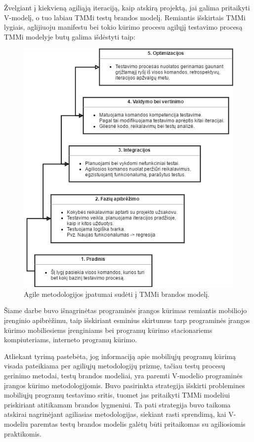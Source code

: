 \documentclass{VUMIFPSkursinis}
\begin{document}
Žvelgiant į kiekvieną agiliąją iteraciją, kaip atskirą projektą, jai galima pritaikyti V-modelį, o tuo labiau TMMi testų brandos modelį. Remiantis išskirtais TMMi lygiais, aglijiuoju manifestu bei tokio kūrimo procesu agilųjį testavimo procesą TMMi modelyje butų galima išdėstyti taip:

\begin{figure}[H]
    \centering
    \includegraphics[scale=0.85]{img/Tmmagile}
    \caption{Agile metodologijos įpatumai sudėti į TMMi brandos modelį.}
    \label{img:tmmiagile}
\end{figure}

Šiame darbe buvo išnagrinėtas programinės įrangos kūrimas remiantis mobiliojo įrenginio apibrėžimu, taip išskiriant esminius skirtumus tarp programinės įrangos kūrimo mobiliesiems įrenginiams bei programų kūrimo stacionariems kompiuteriams, interneto programų kūrimo.

Atliekant tyrimą pastebėta, jog informaciją apie mobiliųjų programų kūrimą visada pateikiama per agiliųjų metodologijų prizmę, tačiau testų procesų gerinimo metodai, testų brandos modeliai, yra paremti V-modelio programinės įrangos kūrimo metodologijomis. Buvo pasirinkta strategija išskirti problemines mobiliųjų programų testavimo sritis, tuomet jas pritaikyti TMMi modeliui priskiriant atitikamam brandos lygmeniui. Ta pati strategija buvo taikoma atskirai nagrinėjant agiliasias metodologijas, siekiant rasti sprendimą, kai V-modeliu paremtas testų brandos modelis galėtų būti pritaikomas su agiliosiomis praktikomis.
\end{document}
